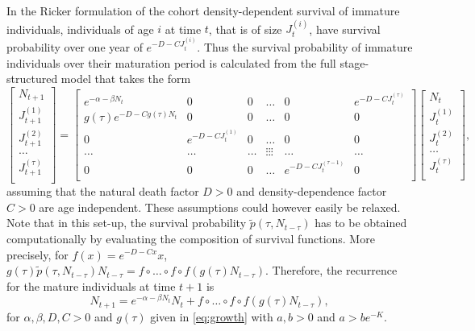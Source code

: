 \documentclass{article}
\numberwithin{theorem}{section}
\begin{document}
{In the Ricker formulation of the cohort density-dependent survival of immature individuals, individuals of age $i$ at time $t$, that is of size $J_t^{(i)}$, have survival probability over one year of $e^{-D-CJ_t^{(i)}}$. Thus the survival probability of immature individuals over their maturation period is calculated from the full stage-structured model that takes the form
\begin{equation} \label{eqn:RickerRicker}
   \begin{bmatrix}
    N_{t+1}\\
    J_{t+1}^{(1)}\\
    J_{t+1}^{(2)}\\
    \ldots\\
    J_{t+1}^{(\tau)}\\
    \end{bmatrix} = \begin{bmatrix}
e^{-\alpha-\beta N_t} & 0 & 0 & \ldots & 0 & e^{-D-CJ_{t}^{(\tau)}}\\
 g(\tau)e^{-D-C g(\tau)N_{t}} & 0 & 0 & \ldots & 0 & 0\\
0 & e^{-D-CJ_{t}^{(1)}} & 0 & \ldots & 0 & 0\\
\ldots & \ldots & \ldots & \vdots\vdots\vdots & \ldots & \ldots\\
0 & 0 & 0 & \ldots & e^{-D-CJ_{t}^{(\tau-1)}} & 0\\
\end{bmatrix}
\begin{bmatrix}
    N_t\\
    J_t^{(1)}\\
    J_t^{(2)}\\
    \ldots\\
    J_t^{(\tau)}\\
\end{bmatrix},
\end{equation}
assuming that the natural death factor $D>0$ and density-dependence factor $C>0$ are age independent. These assumptions could however easily be relaxed. Note that in this set-up, the survival probability $\widetilde{p}(\tau, N_{t-\tau})$ has to be obtained computationally by evaluating the composition of survival functions. More precisely, for $f(x)=e^{-D-Cx}x$, $g(\tau)\widetilde{p}(\tau, N_{t-\tau})N_{t-\tau}=f\circ \ldots \circ f\circ f(g(\tau)N_{t-\tau})$. Therefore, the recurrence for the mature individuals at time $t+1$ is
\begin{equation*}
    N_{t+1}=e^{-\alpha-\beta N_t}N_t+f\circ \ldots \circ f\circ f(g(\tau)N_{t-\tau}),
\end{equation*}
for $\alpha, \beta, D, C>0$ and $g(\tau)$ given in \eqref{eq:growth} with $a,b>0$ and $a>be^{-K}$.


}
\end{document}
